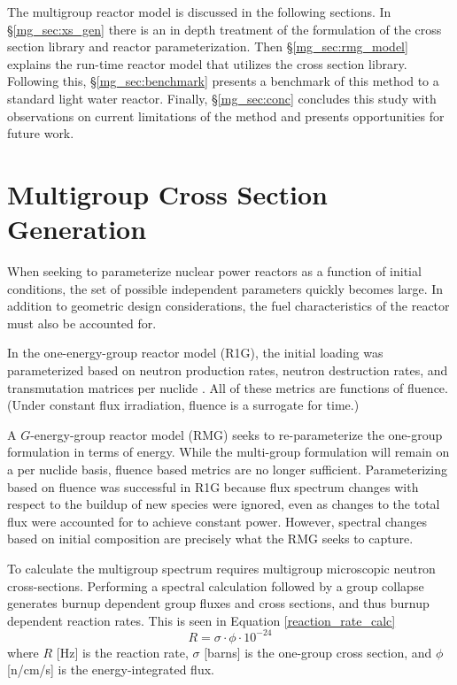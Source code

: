 The multigroup reactor model is discussed in the following sections.  In \S \ref{mg_sec:xs_gen} 
there is an in depth treatment of the formulation of the cross section library and reactor 
parameterization.  Then \S \ref{mg_sec:rmg_model} explains the run-time reactor model that 
utilizes the cross section library.  Following this, \S \ref{mg_sec:benchmark} presents a 
benchmark of this method to a standard light water reactor.  Finally, \S \ref{mg_sec:conc}
concludes this study with observations on current limitations of the method and presents 
opportunities for future work.



\section{Multigroup Cross Section Generation}
\label{mg_sec:xs_gen}
When seeking to parameterize nuclear power reactors as a function of initial conditions, 
the set of possible independent parameters quickly becomes large. In addition to geometric 
design considerations, the fuel characteristics of the reactor must also be accounted for.

In the one-energy-group reactor model (R1G), the initial loading was parameterized based
on neutron production rates, neutron destruction rates, and transmutation matrices per
nuclide \cite{Scopatz2009}.  All of these metrics are functions of fluence.  (Under 
constant flux irradiation, fluence is a surrogate for time.)

A $G$-energy-group reactor model (RMG) seeks to re-parameterize the one-group formulation 
in terms of energy.  While the multi-group formulation will remain on a per nuclide basis, 
fluence based metrics are no longer sufficient.  Parameterizing based on fluence was successful in R1G because 
flux spectrum changes with respect to the buildup of new species were ignored, even as changes to the total 
flux were accounted for to achieve constant power.   However, 
spectral changes based on initial composition are precisely what the RMG seeks to capture.

To calculate the multigroup spectrum requires multigroup microscopic neutron cross-sections.  
Performing a spectral calculation followed by a group collapse generates burnup dependent 
group fluxes and cross sections, and thus burnup dependent reaction rates.
This is seen in Equation \ref{reaction_rate_calc}
\begin{equation}
\label{reaction_rate_calc}
R = \sigma \cdot \phi \cdot 10^{-24}
\end{equation}
where $R$ [Hz] is the reaction rate, $\sigma$ [barns] is the one-group cross section, and
$\phi$ [n/cm/s] is the energy-integrated flux.

